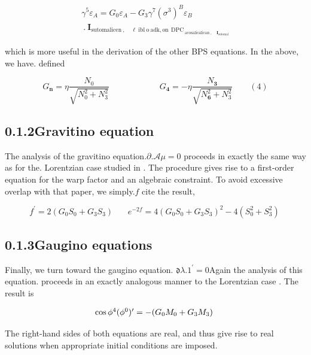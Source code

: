 \documentclass{article}
\begin{document}
\begin{equation}
\begin{array} { r } { \gamma ^ { 5 } \varepsilon _ { A } = G _ { 0 } \varepsilon _ { A } - G _ { 3 } \gamma ^ { 7 } ( \sigma ^ { 3 } ) ^ { B } \varepsilon _ { B } } \\ { \mathrm { ~. ~ } \mathbf { I } _ { \mathrm { s u t o m a l i c e n ~ }, \quad \ell \mathrm { ~ i b l ~ o ~ a d k, o n ~ } \mathrm { ~ D P C } } _ { \mathrm { ~ a c o s a l i c a l i c a n ~ }, \quad \mathbf { I } _ { \mathrm { s u t o m a l}}}}\end{array}
\end{equation}


which is more useful in the derivation of the other BPS equations. In the above, we have.
defined


\begin{equation}
G _ { \mathbf { n } } = \eta \frac { N _ { 0 } } { \sqrt { N _ { 0 } ^ { 2 } + N _ { 3 } ^ { 2 } } } \qquad \qquad \qquad G _ { \mathbf { 4 } } = - \eta \frac { N _ { \mathbf { 3 } } } { \sqrt { N _ { \mathbf { 6 } } ^ { 2 } + N _ { 3 } ^ { 2 } } } \qquad ( 4 )
\end{equation}


\subsection*{0.1.2Gravitino equation}


The analysis of the gravitino equation.$\partial . { \mathcal { A } \mu } = 0$ proceeds in exactly the same way as for the.
Lorentzian case studied in . The procedure gives rise to a first-order equation for the warp
factor and an algebraic constraint. To avoid excessive overlap with that paper, we simply.$f$
cite the result,


\begin{equation}
f ^ { \prime } = 2 ( G _ { 0 } S _ { 0 } + G _ { 3 } S _ { 3 } ) ~ ~ ~ ~ ~ ~ ~ ~ e ^ { - 2 f } = 4 ( G _ { 0 } S _ { 0 } + G _ { 3 } S _ { 3 } ) ^ { 2 } - 4 ( S _ { 0 } ^ { 2 } + S _ { 3 } ^ { 2 } ) ~
\end{equation}


\subsection*{0.1.3Gaugino equations}


Finally, we turn toward the gaugino equation. $\mathfrak { d } \lambda . { 1 } ^ { \prime } = 0$Again the analysis of this equation.
proceeds in an exactly analogous manner to the Lorentzian case . The result is


\begin{equation}
\begin{array} { c c } { \cos \phi ^ { 4 } ( \phi ^ { 0 } ) ^ { \prime } = - ( G _ { 0 } M _ { 0 } + G _ { 3 } M _ { 3 } ) ~ }\end{array}
\end{equation}


The right-hand sides of both equations are real, and thus give rise to real solutions when
appropriate initial conditions are imposed.
\end{document}
